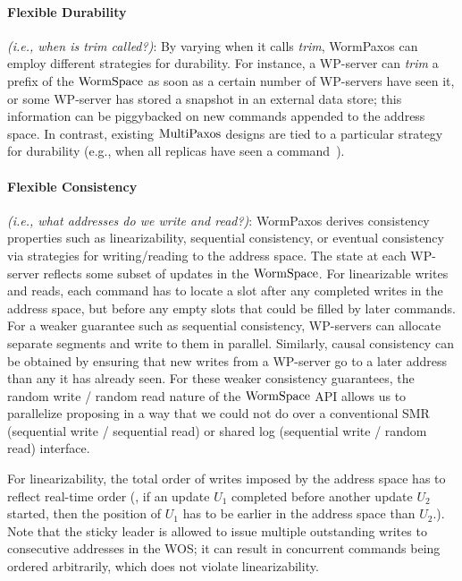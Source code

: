 {\paragraph{Flexible Durability} \textit{(i.e., when is \textit{trim} called?)}: By varying when it calls \textit{trim}, 
WormPaxos can employ different strategies for durability. For instance, a WP-server can \textit{trim} a prefix of the $\mathrm{WormSpace}$ 
as soon as a certain number of WP-servers{} have seen it, or some WP-server has stored a snapshot in an external data store; 
this information can be piggybacked on new commands appended to the address space. 
In contrast, existing $\mathrm{MultiPaxos}$ designs are tied to a particular strategy for durability (e.g., when all replicas have seen a command~\cite{rvrpaxos}).

\paragraph{Flexible Consistency} \textit{(i.e., what addresses do we \textit{write} and \textit{read}?)}: 
WormPaxos derives consistency properties such as linearizability, sequential consistency, 
or eventual consistency via strategies for writing/reading to the address space. 
The state at each WP-server reflects some subset of updates in the $\mathrm{WormSpace}$. 
For linearizable writes and reads, each command has to locate a slot after any completed writes in the address space, 
but before any empty slots that could be filled by later commands. For a weaker guarantee such as sequential consistency, 
WP-servers{} can allocate separate segments and write to them in parallel. 
Similarly, causal consistency can be obtained by ensuring that new writes from a WP-server go to a later address than any it has already seen.
For these weaker consistency guarantees, the random write / random read nature of the $\mathrm{WormSpace}$ 
API allows us to parallelize proposing in a way that we could not do over a conventional SMR 
(sequential write / sequential read) or shared log (sequential write / random read) interface. }

For linearizability, the total order of writes imposed by the address space has to reflect real-time order 
(\ie, if an update $U_1$ completed before another update $U_2$ started, then the position of $U_1$ has to be earlier in the address space than $U_2$.).
Note that the sticky leader is allowed to issue multiple outstanding writes to consecutive addresses in the WOS; 
it can result in concurrent commands being ordered arbitrarily, which does not violate linearizability.


